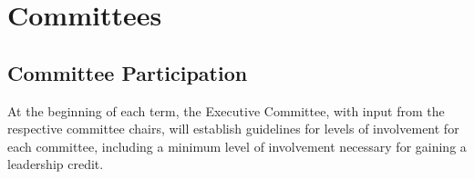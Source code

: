

\chapter{Committees}\label{sec:committees}%
\section{Committee Participation}\label{sec:commPart} At the beginning of each term, the Executive Committee, with input from the respective committee chairs, will establish guidelines for levels of involvement for each committee, including a minimum level of involvement necessary for gaining a leadership credit.
